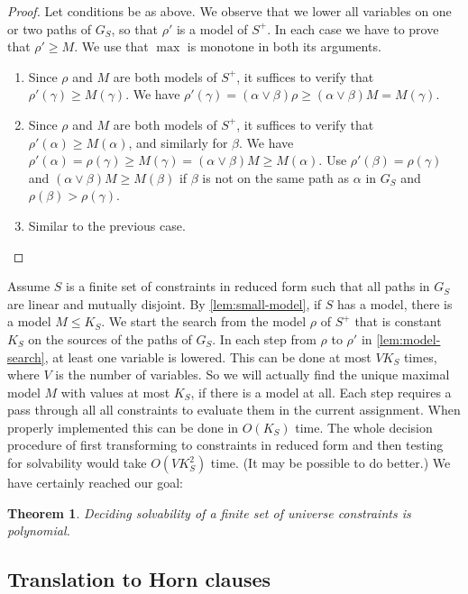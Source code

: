 \documentclass[11pt,a4paper]{article}
\newtheorem{theorem}{Theorem}[section]
\begin{document}
\begin{proof}
Let conditions be as above. We observe that we lower all variables on one or two
paths of $G_S$, so that $\rho'$ is a model of $S^+$. In each case we
have to prove that $\rho'\geq M$.
We use that $\max$ is monotone in both its arguments.
\begin{enumerate}
\item Since $\rho$ and $M$ are both models of $S^+$, it suffices to 
verify that $\rho'(\gamma)\geq M(\gamma)$. We have 
$\rho'(\gamma)= (\alpha\vee\beta)\rho \geq (\alpha\vee\beta)M = M(\gamma)$.
\item Since $\rho$ and $M$ are both models of $S^+$, it suffices to 
verify that $\rho'(\alpha)\geq M(\alpha)$, and similarly for $\beta$. We have
$\rho'(\alpha)= \rho(\gamma)\geq M(\gamma) = (\alpha\vee\beta)M \geq M(\alpha)$.
Use $\rho'(\beta) = \rho(\gamma)$ and $(\alpha\vee\beta)M \geq M(\beta)$
if $\beta$ is not on the same path as $\alpha$ in $G_S$ and $\rho(\beta)>\rho(\gamma)$. 
\item Similar to the previous case.
\end{enumerate}
\end{proof}

Assume $S$ is a finite set of constraints in reduced form such that all paths 
in $G_S$ are linear and mutually disjoint. By \cref{lem:small-model},
if $S$ has a model, there is a model $M \leq K_S$.
We start the search from the model $\rho$ of $S^+$ that is constant $K_S$
on the sources of the paths of $G_S$.
In each step from $\rho$ to $\rho'$ in \cref{lem:model-search},
at least one variable is lowered. This can be done at most $V K_S$ times,
where $V$ is the number of variables. So we will actually find the unique maximal
model $M$ with values at most $K_S$, if there is a model at all.
Each step requires a pass through all
all constraints to evaluate them in the current assignment.
When properly implemented this can be done in $O(K_S)$ time.
The whole decision procedure of first transforming to constraints in reduced
form and then testing for solvability would take $O(V K^2_S)$ time.
(It may be possible to do better.) We have certainly reached our goal:

\begin{theorem}\label{thm:P-solvability}
Deciding solvability of a finite set of universe constraints is polynomial.
\end{theorem}

\subsection{Translation to Horn clauses}
\end{document}
